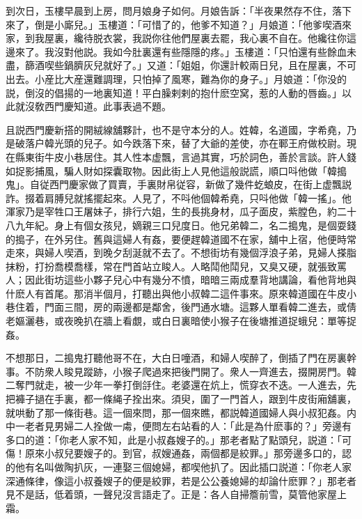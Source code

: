 到次日，玉樓早晨到上房，問月娘身子如何。月娘告訴：「半夜果然存不住，落下來了，倒是小廝兒。」玉樓道：「可惜了的，他爹不知道？」月娘道：「他爹喫酒來家，到我屋裏，纔待脱衣裳，我説你往他們屋裏去罷，我心裏不自在。他纔往你這邊來了。我沒對他説。我如今肚裏還有些隱隱的疼。」玉樓道：「只怕還有些餘血未盡，篩酒喫些鍋臍灰兒就好了。」又道：「姐姐，你還計較兩日兒，且在屋裏，不可出去。小産比大産還難調理，只怕掉了風寒，難為你的身子。」月娘道：「你没的説，倒沒的倡揚的一地裏知道！平白臊剌剌的抱什麽空窝，惹的人動的唇齒。」以此就沒敎西門慶知道。此事表過不題。

且説西門慶新搭的開絨線舖夥計，也不是守本分的人。姓韓，名道國，字希堯，乃是破落户韓光頭的兒子。如今跌落下來，替了大爺的差使，亦在鄆王府做校尉。現在縣東街牛皮小巷居住。其人性本虚飄，言過其實，巧於詞色，善於言談。許人錢如捉影捕風，騙人財如探囊取物。因此街上人見他這般説謊，順口呌他做「韓搗鬼」。自従西門慶家做了買賣，手裏財帛従容，新做了幾件虼蜋皮，在街上虚飄説詐。掇着肩膊兒就搖擺起來。人見了，不呌他個韓希堯，只呌他做「韓一搖」。他渾家乃是宰牲口王屠妹子，排行六姐，生的長挑身材，瓜子面皮，紫膛色，約二十八九年紀。身上有個女孩兒，嫡親三口兒度日。他兄弟韓二，名二搗鬼，是個耍錢的搗子，在外另住。舊與這婦人有姦，要便趕韓道國不在家，舖中上宿，他便時常走來，與婦人喫酒，到晚夕刮涎就不去了。不想街坊有幾個浮浪子弟，見婦人搽脂抹粉，打扮喬模喬樣，常在門首站立睃人。人略鬦他鬦兒，又臭又硬，就張致罵人；因此街坊這些小夥子兒心中有幾分不憤，暗暗三兩成羣背地講論，看他背地與什麽人有首尾。那消半個月，打聽出與他小叔韓二這件事來。原來韓道國在牛皮小巷住着，門面三間，房的兩邊都是鄰舍，後門通水塘。這夥人單看韓二進去，或倩老嫗灑巷，或夜晚扒在牆上看覷，或白日裏暗使小猴子在後塘推道捉蛾兒：單等捉姦。

不想那日，二搗鬼打聽他哥不在，大白日噇酒，和婦人喫醉了，倒插了門在房裏幹事。不防衆人睃見蹤跡，小猴子爬過來把後門開了。衆人一齊進去，掇開房門。韓二奪門就走，被一少年一拳打倒㧱住。老婆還在炕上，慌穿衣不迭。一人進去，先把褲子撾在手裏，都一條䋲子拴出來。須臾，圍了一門首人，跟到牛皮街廂舖裏，就哄動了那一條街巷。這一個來問，那一個來瞧，都説韓道國婦人與小叔犯姦。内中一老者見男婦二人拴做一䖏，便問左右站看的人：「此是為什麽事的？」旁邊有多口的道：「你老人家不知，此是小叔姦嫂子的。」那老者點了點頭兒，説道：「可傷！原來小叔兒要嫂子的。到官，叔嫂通姦，兩個都是絞罪。」那旁邊多口的，認的他有名叫做陶扒灰，一連娶三個媳婦，都喫他扒了。因此插口説道：「你老人家深通條律，像這小叔養嫂子的便是絞罪，若是公公養媳婦的却論什麽罪？」那老者見不是話，低着頭，一聲兒沒言語走了。正是：各人自掃簷前雪，莫管他家屋上霜。

